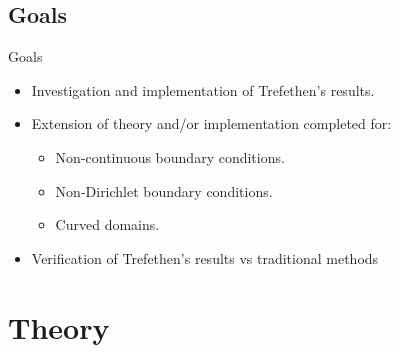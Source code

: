 \documentclass[envcountsect notes]{beamer}       %
\begin{document}
\subsection{Goals}
\begin{frame}{Goals}
        \begin{itemize}
            \item Investigation and implementation of Trefethen's results.
            \item Extension of theory and/or implementation completed for: 
           \begin{itemize}
                \item Non-continuous boundary conditions.
                \item Non-Dirichlet boundary conditions.
                \item Curved domains. 
            \end{itemize}
            \item Verification of Trefethen's results vs traditional methods
        \end{itemize} 
\end{frame}


\section{Theory}
\end{document}
